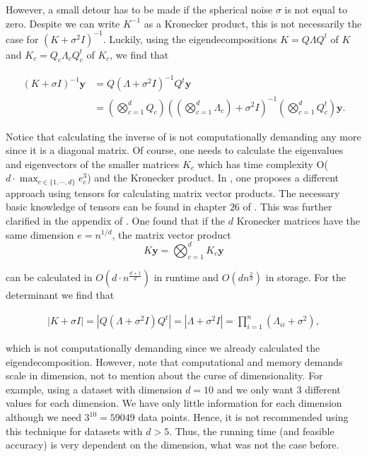\documentclass[12pt,a4paper,oneside]{book}
\begin{document}
However, a small detour has to be made if the spherical noise $\sigma$ is not equal to zero. Despite we can write $K^{-1}$ as a Kronecker product, this is not necessarily the case for $(K + \sigma^2 I)^{-1}$. Luckily, using the eigendecompositions $ K = Q \Lambda Q^t$ of $K$ and  $K_c = Q_c \Lambda_c Q_c^t$ of $K_c$, we find that 

\begin{align}
(K + \sigma I)^{-1} \bm{y} &= Q ( \Lambda + \sigma^2 I)^{-1} Q^t \bm{y} \nonumber \\ 
&= \left( \bigotimes\limits_{c=1}^d Q_c \right)  \left( \left(\bigotimes\limits_{c=1}^d \Lambda_c \right)  + \sigma^2 I \right)^{-1} \left( \bigotimes\limits_{c=1}^d Q^t_c \right) \bm{y}.
\end{align}

Notice that calculating the inverse of is not computationally demanding any more since it is a diagonal matrix. Of course, one needs to calculate the eigenvalues and eigenvectors of the smaller matrices $K_c$ which has time complexity O($ d \cdot \max\nolimits_{c \in \{1,\cdots,d\}} e_c^3$) and the Kronecker product. In \cite{saatcci2012scalable}, one proposes a different approach using tensors for calculating matrix vector products. The necessary basic knowledge of tensors can be found in chapter $26$ of \cite{riley2006mathematical}. This was further clarified in the appendix of \cite{wilson2014covariance}. One found that if the $d$ Kronecker matrices have the same dimension $e = n^{1/d}$, the matrix vector product 
\begin{equation}
K \bm{y} = \bigotimes_{c=1}^d K_c \bm{y}
\end{equation}

can be calculated in $O\left(d \cdot n^{\frac{d+1}{d}} \right)$ in runtime and $O(d n^{\frac{2}{d}})$ in storage. For the determinant we find that 

\begin{align}
| K + \sigma I | = |Q ( \Lambda + \sigma^2 I) Q^t| =  |\Lambda + \sigma^2 I | = \prod_{i=1}^n (\Lambda_{ii} + \sigma^2),
\end{align}

which is not computationally demanding since we already calculated the eigendecomposition. However, note that computational and memory demands scale in dimension, not to mention about the curse of dimensionality. For example, using a dataset with dimension $d =10$ and we only want $3$ different values for each dimension. We have only little information for each dimension although we need $3^{10} = 59049$ data points. Hence, it is not recommended using this technique for datasets with $d > 5$.  Thus, the running time (and feasible accuracy) is very dependent on the dimension, what was not the case before.  
\end{document}
